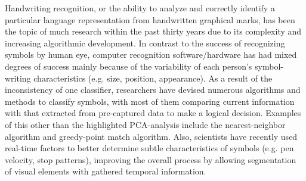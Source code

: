 \documentclass[twocolumn]{article}
\begin{document}
Handwriting recognition, or the ability to analyze and correctly identify a particular language representation from handwritten graphical marks, has been the topic of much research within the past thirty years due to its complexity and increasing algorithmic development. In contrast to the success of recognizing symbols by human eye, computer recognition software/hardware has had mixed degrees of success mainly because of the variability of each person's symbol-writing characteristics (e.g. size, position, appearance). As a result of the inconsistency of one classifier, researchers have devised numerous algorithms and methods to classify symbols, with most of them comparing current information with that extracted from pre-captured data to make a logical decision. Examples of this other than the highlighted PCA-analysis include the nearest-neighbor algorithm and greedy-point match algorithm. Also, scientists have recently used real-time factors to better determine subtle characteristics of symbols (e.g. pen velocity, stop patterns), improving the overall process by allowing segmentation of visual elements with gathered temporal information. 
\end{document}
